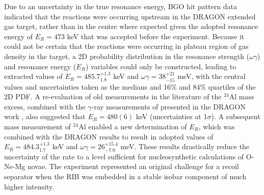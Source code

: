 Due to an uncertainty in the true resonance energy, BGO hit pattern data indicated that the reactions were occurring upstream in the DRAGON extended gas target, rather than in the centre where expected given the adopted resonance energy of $E_{R}=473$ keV that was accepted before the experiment. Because it could not be certain that the reactions were occurring in plateau region of gas density in the target, a 2D probability distribution in the resonance strength ($\omega\gamma$) and resonance energy ($E_{R}$) variables could only be constructed, leading to extracted values of $E_{R}=485.7^{+1.3}_{1.8}$ keV and $\omega\gamma=38^{+21}_{-15}$ meV, with the central values and uncertainties taken as the medians and 16\% and 84\% quartiles of the 2D PDF. 
A re-evaluation of old measurements in the literature of the $^{24}$Al mass excess, combined with the $\gamma$-ray measurements of \cite{lot08} presented in the DRAGON work \cite{eri10}, also suggested that $E_{R}=480(6)$ keV (uncertainties at 1$\sigma$).     
A subsequent mass measurement \cite{wre10} of $^{24}$Al enabled a new determination of $E_{R}$, which was combined with the DRAGON results to result in adopted values of $E_{R}=484.3^{+1.3}_{1.7}$ keV and $\omega\gamma=26^{+15.4}_{-7.0}$ meV.
These results drastically reduce the uncertainty of the  rate to a level sufficient for nucleosynthetic calculations of O-Ne-Mg novae. The experiment represented an original challenge for a recoil separator when the RIB was embedded in a stable isobar component of much higher intensity. 

